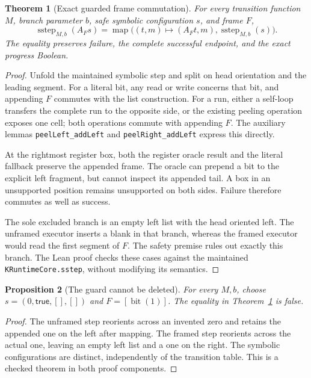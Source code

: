 \documentclass[11pt]{article}
\newtheorem{theorem}{Theorem}[section]
\newtheorem{proposition}[theorem]{Proposition}
\theoremstyle{definition}\newtheorem{definition}[theorem]{Definition}
\theoremstyle{remark}\newtheorem{remark}[theorem]{Remark}
\newcommand{\Step}{\operatorname{sstep}}
\newcommand{\code}[1]{\nolinkurl{#1}}
\begin{document}
\begin{theorem}[Exact guarded frame commutation]\label{thm:frame}
For every transition function $M$, branch parameter $b$, safe symbolic configuration $s$, and frame $F$,
\[
 \Step_{M,b}(A_Fs)
 =\operatorname{map}\bigl((t,m)\mapsto(A_Ft,m),\Step_{M,b}(s)\bigr).
\]
The equality preserves failure, the complete successful endpoint, and the exact progress Boolean.
\end{theorem}
\begin{proof}
Unfold the maintained symbolic step and split on head orientation and the leading segment. For a literal bit, any read or write concerns that bit, and appending $F$ commutes with the list construction. For a run, either a self-loop transfers the complete run to the opposite side, or the existing peeling operation exposes one cell; both operations commute with appending $F$. The auxiliary lemmas \code{peelLeft_addLeft} and \code{peelRight_addLeft} express this directly.

At the rightmost register box, both the register oracle result and the literal fallback preserve the appended frame. The oracle can prepend a bit to the explicit left fragment, but cannot inspect its appended tail. A box in an unsupported position remains unsupported on both sides. Failure therefore commutes as well as success.

The sole excluded branch is an empty left list with the head oriented left. The unframed executor inserts a blank in that branch, whereas the framed executor would read the first segment of $F$. The safety premise rules out exactly this branch. The Lean proof checks these cases against the maintained \code{KRuntimeCore.sstep}, without modifying its semantics.
\end{proof}

\begin{proposition}[The guard cannot be deleted]
For every $M,b$, choose $s=(0,\mathsf{true},[],[])$ and $F=[\operatorname{bit}(1)]$. The equality in Theorem~\ref{thm:frame} is false.
\end{proposition}
\begin{proof}
The unframed step reorients across an invented zero and retains the appended one on the left after mapping. The framed step reorients across the actual one, leaving an empty left list and a one on the right. The symbolic configurations are distinct, independently of the transition table. This is a checked theorem in both proof components.
\end{proof}
\end{document}
